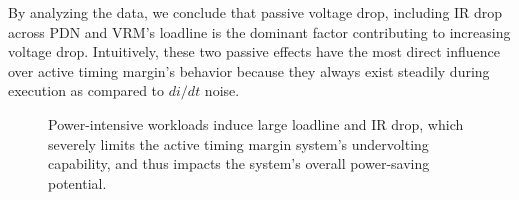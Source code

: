 By analyzing the data, we conclude that passive voltage drop, including IR drop across PDN and VRM's loadline is the dominant factor contributing to increasing voltage drop. Intuitively, these two passive effects have the most direct influence over active timing margin's behavior because they always exist steadily during execution as compared to $di/dt$ noise.

\begin{figure}[t]
\centering
  \caption{Power-intensive workloads induce large loadline and IR drop, which severely limits the active timing margin system's undervolting capability, and thus impacts the system's overall power-saving potential.}
  \label{fig:ldir-proof}
\end{figure}

